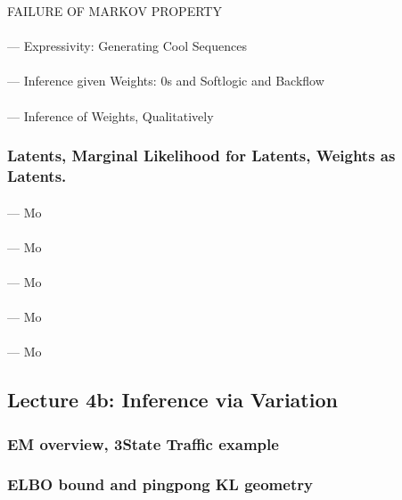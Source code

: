\documentclass[12pt]{article}
\begin{document}
        FAILURE OF MARKOV PROPERTY

        \paragraph{\sf} --- Expressivity: Generating Cool Sequences
        \paragraph{\sf} --- Inference given Weights: 0s and Softlogic and Backflow
        \paragraph{\sf} --- Inference of Weights, Qualitatively

      \subsubsection*{Latents, Marginal Likelihood for Latents, Weights as Latents.}
        \paragraph{\sf} --- Mo
        \paragraph{\sf} --- Mo
        \paragraph{\sf} --- Mo
        \paragraph{\sf} --- Mo
        \paragraph{\sf} --- Mo

    \newpage

    \subsection*{Lecture 4b: Inference via Variation} %
      \subsubsection*{EM overview, 3State Traffic example}
      \subsubsection*{ELBO bound and pingpong KL geometry}
\end{document}
